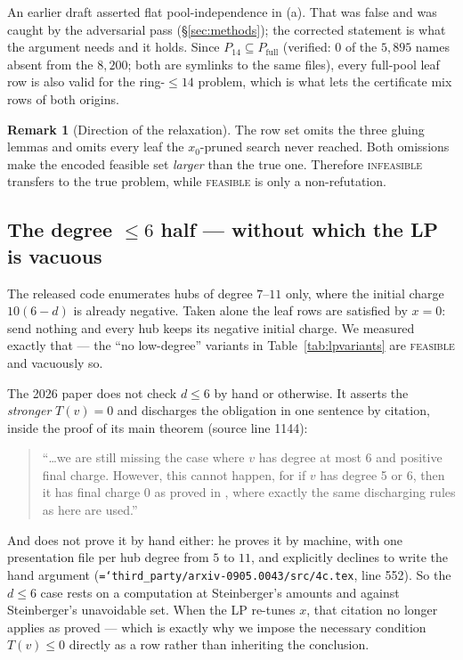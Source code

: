 \documentclass[11pt]{article}
\theoremstyle{definition}
\newtheorem{remark}[theorem]{Remark}
\newcommand{\art}[1]{{\texttt{\hyphenchar\font=`\-\relax #1}}}
\begin{document}
An earlier draft asserted flat pool-independence in (a). That was false and was
caught by the adversarial pass (\S\ref{sec:methods}); the corrected statement is
what the argument needs and it holds. Since $P_{14}\subseteq P_{\text{full}}$
(verified: $0$ of the $5{,}895$ names absent from the $8{,}200$; both are symlinks to
the same files), every full-pool leaf row is also valid for the ring-$\le 14$
problem, which is what lets the certificate mix rows of both origins.

\begin{remark}[Direction of the relaxation]
The row set omits the three gluing lemmas and omits every leaf the $x_0$-pruned
search never reached. Both omissions make the encoded feasible set \emph{larger}
than the true one. Therefore \textsc{infeasible} transfers to the true problem,
while \textsc{feasible} is only a non-refutation.
\end{remark}

\subsection{The degree $\le 6$ half --- without which the LP is vacuous}
\label{sec:lowdeg}

The released code enumerates hubs of degree $7$--$11$ only, where the initial charge
$10(6-d)$ is already negative. Taken alone the leaf rows are satisfied by $x=0$:
send nothing and every hub keeps its negative initial charge. We measured exactly
that --- the ``no low-degree'' variants in Table~\ref{tab:lpvariants} are
\textsc{feasible} and vacuously so.

The 2026 paper does not check $d\le 6$ by hand or otherwise. It asserts the
\emph{stronger} $T(v)=0$ and discharges the obligation in one sentence by citation,
inside the proof of its main theorem (source line 1144):
\begin{quote}\small
``\dots we are still missing the case where $v$ has degree at most $6$ and positive
final charge. However, this cannot happen, for if $v$ has degree 5 or 6, then it has
final charge 0 as proved in \cite{steinberger2010}, where exactly the same
discharging rules as here are used.''
\end{quote}
And \cite{steinberger2010} does not prove it by hand either: he proves it by machine,
with one presentation file per hub degree from $5$ to $11$, and explicitly declines
to write the hand argument
(\art{third\_party/arxiv-0905.0043/src/4c.tex}, line 552). So the $d\le 6$ case rests
on a computation at Steinberger's amounts and against Steinberger's unavoidable set.
When the LP re-tunes $x$, that citation no longer applies as proved --- which is
exactly why we impose the necessary condition $T(v)\le 0$ directly as a row rather
than inheriting the conclusion.
\end{document}
